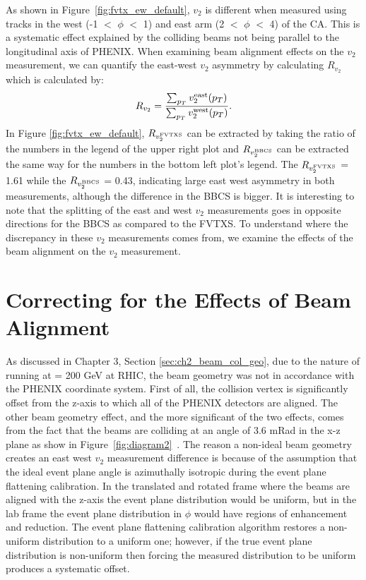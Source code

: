 As shown in Figure~\ref{fig:fvtx_ew_default}, $v_2$ is different when measured using tracks in the west (-1 $<$ $\phi$ $<$ 1) and east arm (2 $<$ $\phi$ $<$ 4) of the CA. This is a systematic effect explained by the colliding beams not being parallel to the longitudinal axis of PHENIX. When examining beam alignment effects on the $v_2$ measurement, we can quantify the east-west $v_2$ asymmetry by calculating $R_{v_2}$ which is calculated by: 
\begin{equation}
R_{v_2} = \frac{\sum_{p_T}{v_2^{\rm east}(p_T)}}{\sum_{p_T}{v_2^{\rm west}(p_T)}}.
\end{equation}
In Figure \ref{fig:fvtx_ew_default}, $R_{v_2^{\rm FVTXS}}$ can be extracted by taking the ratio of the numbers in the legend of the upper right plot and $R_{v_2^{\rm BBCS}}$ can be extracted the same way for the numbers in the bottom left plot's legend. The $R_{v_2^{\rm FVTXS}}$ = 1.61 while the $R_{v_2^{\rm BBCS}}$ = 0.43, indicating large east west asymmetry in both measurements, although the difference in the BBCS is bigger. It is interesting to note that the splitting of the east and west $v_2$ measurements goes in opposite directions for the BBCS as compared to the FVTXS. To understand where the discrepancy in these $v_2$ measurements comes from, we examine the effects of the beam alignment on the $v_2$ measurement.
\section{Correcting for the Effects of Beam Alignment}
As discussed in Chapter 3, Section \ref{sec:ch2_beam_col_geo}, due to the nature of running \pau at \sqsn = 200 GeV at RHIC, the beam geometry was not in accordance with the PHENIX coordinate system. First of all, the collision vertex is significantly offset from the z-axis to which all of the PHENIX detectors are aligned. The other beam geometry effect, and the more significant of the two effects, comes from the fact that the beams are colliding at an angle of 3.6 mRad in the x-z plane as show in Figure~\ref{fig:diagram2}~\cite{BNL_Run15_Operations}. The reason a non-ideal beam geometry creates an east west $v_2$ measurement difference is because of the assumption that the ideal event plane angle is azimuthally isotropic during the event plane flattening calibration. In the translated and rotated frame where the beams are aligned with the z-axis the event plane distribution would be uniform, but in the lab frame the event plane distribution in $\phi$ would have regions of enhancement and reduction. The event plane flattening calibration algorithm restores a non-uniform distribution to a uniform one; however, if the true event plane distribution is non-uniform then forcing the measured distribution to be uniform produces a systematic offset.

